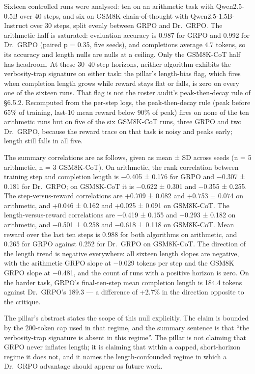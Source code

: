\documentclass[12pt,a4paper]{report}
\begin{document}
Sixteen controlled runs were analysed: ten on an arithmetic task with
Qwen2.5-0.5B over 40 steps, and six on GSM8K chain-of-thought with
Qwen2.5-1.5B-Instruct over 30 steps, split evenly between GRPO and
Dr.~GRPO. The arithmetic half is saturated: evaluation accuracy is 0.987
for GRPO and 0.992 for Dr.~GRPO (paired p = 0.35, five seeds), and
completions average 4.7 tokens, so its accuracy and length nulls are
nulls at a ceiling. Only the GSM8K-CoT half has headroom. At these
30--40-step horizons, neither algorithm exhibits the verbosity-trap
signature on either task: the pillar's length-bias flag, which fires
when completion length grows while reward stays flat or falls, is zero
on every one of the sixteen runs. That flag is not the roster audit's
peak-then-decay rule of §6.5.2. Recomputed from the per-step logs, the
peak-then-decay rule (peak before 65\% of training, last-10 mean reward
below 90\% of peak) fires on none of the ten arithmetic runs but on five
of the six GSM8K-CoT runs, three GRPO and two Dr.~GRPO, because the
reward trace on that task is noisy and peaks early; length still falls
in all five.

The summary correlations are as follows, given as mean ± SD across seeds
(n = 5 arithmetic, n = 3 GSM8K-CoT). On arithmetic, the rank correlation
between training step and completion length is −0.405 ± 0.176 for GRPO
and −0.307 ± 0.181 for Dr.~GRPO; on GSM8K-CoT it is −0.622 ± 0.301 and
−0.355 ± 0.255. The step-versus-reward correlations are +0.709 ± 0.082
and +0.753 ± 0.074 on arithmetic, and +0.046 ± 0.162 and +0.025 ± 0.091
on GSM8K-CoT. The length-versus-reward correlations are −0.419 ± 0.155
and −0.293 ± 0.182 on arithmetic, and −0.501 ± 0.258 and −0.618 ± 0.118
on GSM8K-CoT. Mean reward over the last ten steps is 0.988 for both
algorithms on arithmetic, and 0.265 for GRPO against 0.252 for Dr.~GRPO
on GSM8K-CoT. The direction of the length trend is negative everywhere:
all sixteen length slopes are negative, with the arithmetic GRPO slope
at −0.029 tokens per step and the GSM8K GRPO slope at −0.481, and the
count of runs with a positive horizon is zero. On the harder task,
GRPO's final-ten-step mean completion length is 184.4 tokens against
Dr.~GRPO's 189.3 --- a difference of +2.7\% in the direction opposite to
the critique.

The pillar's abstract states the scope of this null explicitly. The
claim is bounded by the 200-token cap used in that regime, and the
summary sentence is that ``the verbosity-trap signature is absent in
this regime''. The pillar is not claiming that GRPO never inflates
length; it is claiming that within a capped, short-horizon regime it
does not, and it names the length-confounded regime in which a Dr.~GRPO
advantage should appear as future work.
\end{document}

